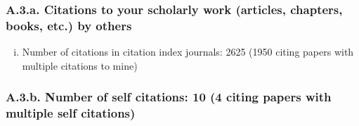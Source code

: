 
\subsubsection*{A.3.a. Citations to your scholarly work (articles, chapters, books, etc.) by others}

\begin{enumerate}[i)]

\item  Number of citations in citation index journals:	2625 (1950 citing papers with multiple citations to mine)

\end{enumerate}

\subsubsection*{A.3.b. Number of self citations: 10 (4 citing papers with multiple self citations)} 


